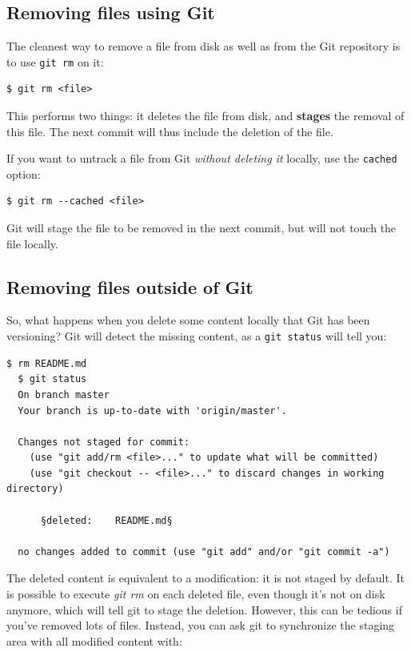 \documentclass{../../common/tufte-latex/tufte-handout}
\begin{document}
\subsection{Removing files using Git}

The cleanest way to remove a file from disk as well as from the Git repository is to use \texttt{git rm} on it:

\begin{lstlisting}[style=BashInputStyle]
  $ git rm <file>
\end{lstlisting}

This performs two things: it deletes the file from disk, and \textbf{stages} the removal of this file.
The next commit will thus include the deletion of the file.

If you want to untrack a file from Git \textit{without deleting it} locally, use the \texttt{cached} option:

\begin{lstlisting}[style=BashInputStyle]
  $ git rm --cached <file>
\end{lstlisting}

Git will stage the file to be removed in the next commit, but will not touch the file locally.

\subsection{Removing files outside of Git}

So, what happens when you delete some content locally that Git has been versioning?
Git will detect the missing content, as a \texttt{git status} will tell you:

\begin{lstlisting}[style=BashInputStyle]
  $ rm README.md
  $ git status
  On branch master
  Your branch is up-to-date with 'origin/master'.

  Changes not staged for commit:
    (use "git add/rm <file>..." to update what will be committed)
    (use "git checkout -- <file>..." to discard changes in working directory)

      §deleted:    README.md§

  no changes added to commit (use "git add" and/or "git commit -a")
\end{lstlisting}

The deleted content is equivalent to a modification: it is not staged by default.
It is possible to execute \textit{git rm} on each deleted file, even though it's not on disk anymore, which will tell git to stage the deletion.
However, this can be tedious if you've removed lots of files.
Instead, you can ask git to synchronize the staging area with all modified content with:
\end{document}
